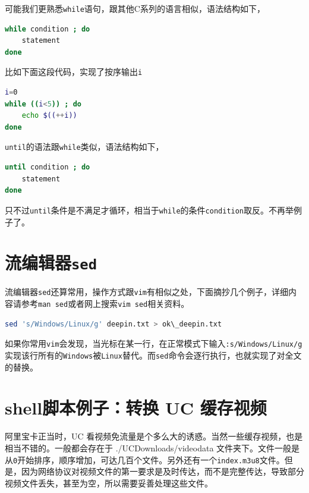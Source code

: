 \documentclass[doctor,openright,twoside]{sjtuthesis}
\newcommand{\passthrough}[1]{#1}
\theoremstyle{plain}
\theoremstyle{definition}
\theoremstyle{remark}
\theoremstyle{ocrenumbox}
\theoremstyle{plain}
\begin{document}
可能我们更熟悉\passthrough{\lstinline!while!}语句，跟其他C系列的语言相似，语法结构如下，

\begin{lstlisting}[language=bash]
while condition ; do
    statement
done
\end{lstlisting}

比如下面这段代码，实现了按序输出\passthrough{\lstinline!i!}

\begin{lstlisting}[language=bash]
i=0
while ((i<5)) ; do
    echo $((++i))
done
\end{lstlisting}

\passthrough{\lstinline!until!}的语法跟\passthrough{\lstinline!while!}类似，语法结构如下，

\begin{lstlisting}[language=bash]
until condition ; do
    statement
done
\end{lstlisting}

只不过\passthrough{\lstinline!until!}条件是不满足才循环，相当于\passthrough{\lstinline!while!}的条件\passthrough{\lstinline!condition!}取反。不再举例子了。

\hypertarget{sed}{%
\section{\texorpdfstring{流编辑器\texttt{sed}}{流编辑器sed}}\label{sed}}

流编辑器\passthrough{\lstinline!sed!}还算常用，操作方式跟\passthrough{\lstinline!vim!}有相似之处，下面摘抄几个例子，详细内容请参考\passthrough{\lstinline!man sed!}或者网上搜索\passthrough{\lstinline!vim sed!}相关资料。

\begin{lstlisting}[language=bash]
sed 's/Windows/Linux/g' deepin.txt > ok\_deepin.txt
\end{lstlisting}

如果你常用\passthrough{\lstinline!vim!}会发现，当光标在某一行，在正常模式下输入\passthrough{\lstinline!:s/Windows/Linux/g!}实现该行所有的\passthrough{\lstinline!Windows!}被\passthrough{\lstinline!Linux!}替代。而\passthrough{\lstinline!sed!}命令会逐行执行，也就实现了对全文的替换。

\hypertarget{shell-uc-}{%
\section{shell脚本例子：转换 UC 缓存视频}\label{shell-uc-}}

阿里宝卡正当时，UC
看视频免流量是个多么大的诱惑。当然一些缓存视频，也是相当不错的。一般都会存在于
./UCDownloads/videodata
文件夹下。文件一般是从\passthrough{\lstinline!0!}开始排序，顺序增加，可达几百个文件。另外还有一个\passthrough{\lstinline!index.m3u8!}文件。但是，因为网络协议对视频文件的第一要求是及时传达，而不是完整传达，导致部分视频文件丢失，甚至为空，所以需要妥善处理这些文件。
\end{document}
